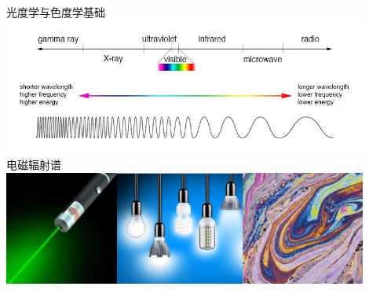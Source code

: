 \documentclass{beamer}
\begin{document}

\begin{frame}[t]{光度学与色度学基础}
\centering
\includegraphics[width=0.9\textwidth]{../Pictures/color_electromagnetic_spectrum.jpg}
\\\vspace{-0.5cm}电磁辐射谱\\
\includegraphics[width=0.9\textwidth]{./Pictures/color.jpg}
\end{frame}
\end{document}
